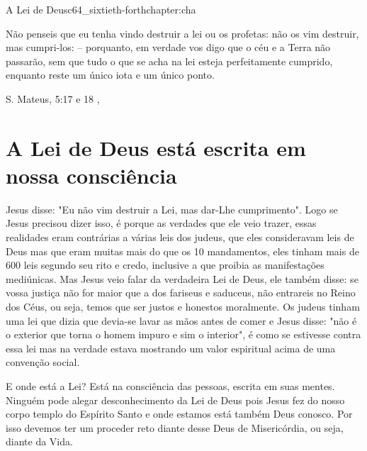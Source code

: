 \begin{chapterpage}{A Lei de Deus}{c64_sixtieth-forthchapter:cha}
 
\begin{myquotation} Não penseis que eu tenha vindo destruir a lei ou os profetas: não os vim destruir, mas cumpri-los: – porquanto, em verdade vos digo que o céu e a Terra não passarão, sem que tudo o que se acha na lei esteja perfeitamente cumprido, enquanto reste um único iota e um único ponto. 
\par\vspace*{15mm}
\mbox{}\hfill \emdash{}S. Mateus, 5:17 e 18
, %
\par\end{myquotation}

\end{chapterpage}



\section{A Lei de Deus está escrita em nossa consciência}\label{c1_basicformatting:sec}

\emdash{}Jesus disse: "Eu não vim destruir a Lei, mas dar-Lhe cumprimento". Logo se Jesus precisou dizer isso, é porque as verdades que ele veio trazer, essas realidades eram contrárias a várias leis dos judeus, que eles consideravam leis de Deus mas que eram muitas mais do que os 10 mandamentos, eles tinham mais de 600 leis segundo seu rito e credo, inclusive a que proibia as manifestações mediúnicas. Mas Jesus veio falar da verdadeira Lei de Deus, ele também disse: se vossa justiça não for maior que a dos fariseus e saduceus, não entrareis no Reino dos Céus, ou seja, temos que ser justos e honestos moralmente. Os judeus tinham uma lei que dizia que devia-se lavar as mãos antes de comer e Jesus disse: "não é o exterior que torna o homem impuro e sim o interior", é como se estivesse contra essa lei mas na verdade estava mostrando um valor espiritual acima de uma convenção social.  

E onde está a Lei? Está na consciência das pessoas, escrita em suas mentes. Ninguém pode alegar desconhecimento da Lei de Deus pois Jesus fez do nosso corpo templo do Espírito Santo e onde estamos está também Deus conosco. Por isso devemos ter um proceder reto diante desse Deus de Misericórdia, ou seja, diante da Vida. 

